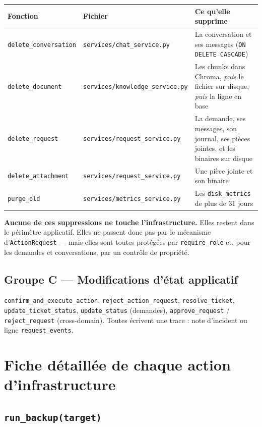 \documentclass[11pt,a4paper]{report}
\newcommand{\file}[1]{\texttt{\small #1}}
\newcommand{\fn}[1]{\texttt{\small\textcolor{oasisviolet}{#1}}}
\newcommand{\cls}[1]{\texttt{\small\textcolor{oasisblue}{#1}}}
\newcommand{\tbl}[1]{\texttt{\small\textcolor{oasisamber}{#1}}}
\begin{document}
\begin{longtable}{@{}p{3.9cm}p{3.4cm}p{7.1cm}@{}}
\toprule
\textbf{Fonction} & \textbf{Fichier} & \textbf{Ce qu'elle supprime}\\
\midrule
\endhead
\fn{delete\_conversation} & \file{services/chat\_service.py} & La conversation et ses messages (\texttt{ON DELETE CASCADE})\\
\fn{delete\_document} & \file{services/knowledge\_service.py} & Les chunks dans Chroma, \emph{puis} le fichier sur disque, \emph{puis} la ligne en base\\
\fn{delete\_request} & \file{services/request\_service.py} & La demande, ses messages, son journal, ses pièces jointes, et les binaires sur disque\\
\fn{delete\_attachment} & \file{services/request\_service.py} & Une pièce jointe et son binaire\\
\fn{purge\_old} & \file{services/metrics\_service.py} & Les \tbl{disk\_metrics} de plus de 31 jours\\
\bottomrule
\end{longtable}

\begin{infobox}
\textbf{Aucune de ces suppressions ne touche l'infrastructure.} Elles restent
dans le périmètre applicatif. Elles ne passent donc pas par le mécanisme
d'\cls{ActionRequest} --- mais elles sont toutes protégées par
\fn{require\_role} et, pour les demandes et conversations, par un contrôle de
propriété.
\end{infobox}

\subsection{Groupe C --- Modifications d'état applicatif}

\fn{confirm\_and\_execute\_action}, \fn{reject\_action\_request},
\fn{resolve\_ticket}, \fn{update\_ticket\_status}, \fn{update\_status}
(demandes), \fn{approve\_request} / \fn{reject\_request} (cross-domain).
Toutes écrivent une trace : note d'incident ou ligne \tbl{request\_events}.

\section{Fiche détaillée de chaque action d'infrastructure}

\subsection{\fn{run\_backup(target)}}
\end{document}
